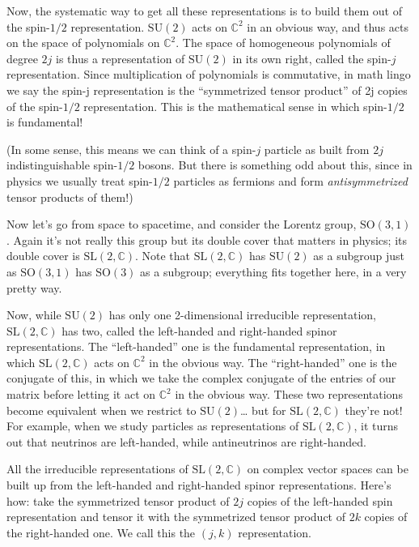 \documentclass{article}
\begin{document}
Now, the systematic way to get all these representations is to build
them out of the spin-\(1/2\) representation. \(\mathrm{SU}(2)\) acts on
\(\mathbb{C}^2\) in an obvious way, and thus acts on the space of
polynomials on \(\mathbb{C}^2\). The space of homogeneous polynomials of
degree \(2j\) is thus a representation of \(\mathrm{SU}(2)\) in its own
right, called the spin-\(j\) representation. Since multiplication of
polynomials is commutative, in math lingo we say the spin-j
representation is the ``symmetrized tensor product'' of 2j copies of the
spin-\(1/2\) representation. This is the mathematical sense in which
spin-\(1/2\) is fundamental!

(In some sense, this means we can think of a spin-\(j\) particle as
built from \(2j\) indistinguishable spin-\(1/2\) bosons. But there is
something odd about this, since in physics we usually treat spin-\(1/2\)
particles as fermions and form \emph{antisymmetrized} tensor products of
them!)

Now let's go from space to spacetime, and consider the Lorentz group,
\(\mathrm{SO}(3,1)\). Again it's not really this group but its double
cover that matters in physics; its double cover is
\(\mathrm{SL}(2,\mathbb{C})\). Note that \(\mathrm{SL}(2,\mathbb{C})\)
has \(\mathrm{SU}(2)\) as a subgroup just as \(\mathrm{SO}(3,1)\) has
\(\mathrm{SO}(3)\) as a subgroup; everything fits together here, in a
very pretty way.

Now, while \(\mathrm{SU}(2)\) has only one 2-dimensional irreducible
representation, \(\mathrm{SL}(2,\mathbb{C})\) has two, called the
left-handed and right-handed spinor representations. The ``left-handed''
one is the fundamental representation, in which
\(\mathrm{SL}(2,\mathbb{C})\) acts on \(\mathbb{C}^2\) in the obvious
way. The ``right-handed'' one is the conjugate of this, in which we take
the complex conjugate of the entries of our matrix before letting it act
on \(\mathbb{C}^2\) in the obvious way. These two representations become
equivalent when we restrict to \(\mathrm{SU}(2)\)\ldots{} but for
\(\mathrm{SL}(2,\mathbb{C})\) they're not! For example, when we study
particles as representations of \(\mathrm{SL}(2,\mathbb{C})\), it turns
out that neutrinos are left-handed, while antineutrinos are
right-handed.

All the irreducible representations of \(\mathrm{SL}(2,\mathbb{C})\) on
complex vector spaces can be built up from the left-handed and
right-handed spinor representations. Here's how: take the symmetrized
tensor product of \(2j\) copies of the left-handed spin representation
and tensor it with the symmetrized tensor product of \(2k\) copies of
the right-handed one. We call this the \((j,k)\) representation.
\end{document}
